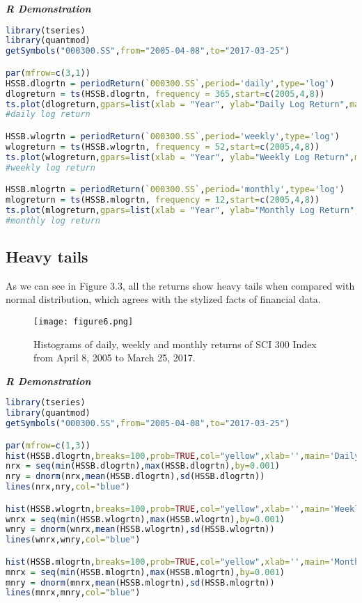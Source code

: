 \documentclass[paper=a4, fontsize=11pt]{scrartcl} %
\numberwithin{equation}{section} %
\numberwithin{figure}{section} %
\numberwithin{table}{section} %
\begin{document}
\bigskip
\textbf{\textit{R Demonstration}}
\begin{lstlisting}[language=R]
library(tseries)
library(quantmod)
getSymbols("000300.SS",from="2005-04-08",to="2017-03-25")

par(mfrow=c(3,1))
HSSB.dlogrtn = periodReturn(`000300.SS`,period='daily',type='log')
dlogreturn = ts(HSSB.dlogrtn, frequency = 365,start=c(2005,4,8))
ts.plot(dlogreturn,gpars=list(xlab = "Year", ylab="Daily Log Return",main="SCI 300 Index [2005/4/8-2017/3/25]",col="blue"))
#daily log return

HSSB.wlogrtn = periodReturn(`000300.SS`,period='weekly',type='log')
wlogreturn = ts(HSSB.wlogrtn, frequency = 52,start=c(2005,4,8))
ts.plot(wlogreturn,gpars=list(xlab = "Year", ylab="Weekly Log Return",main="SCI 300 Index [2005/4/8-2017/3/25]",col="blue"))
#weekly log return

HSSB.mlogrtn = periodReturn(`000300.SS`,period='monthly',type='log')
mlogreturn = ts(HSSB.mlogrtn, frequency = 12,start=c(2005,4,8))
ts.plot(mlogreturn,gpars=list(xlab = "Year", ylab="Monthly Log Return",main="SCI 300 Index [2005/4/8-2017/3/25]",col="blue"))
#monthly log return
\end{lstlisting}

\bigskip
\bigskip
\bigskip
\bigskip
\subsection{Heavy tails}
As we can see in Figure 3.3, all the returns show heavy tails when compared with normal distribution, which agrees with the stylized facts of financial data.\\
\begin{figure}[H]
  \centering
  \texttt{[image: figure6.png]}\\
  \caption{Histograms of daily, weekly and monthly returns of SCI 300 Index from April 8, 2005 to March 25, 2017.}
\end{figure}

\bigskip
\textbf{\textit{R Demonstration}}
\begin{lstlisting}[language=R]
library(tseries)
library(quantmod)
getSymbols("000300.SS",from="2005-04-08",to="2017-03-25")

par(mfrow=c(1,3))
hist(HSSB.dlogrtn,breaks=100,prob=TRUE,col="yellow",xlab='',main='Daily Returns')
nrx = seq(min(HSSB.dlogrtn),max(HSSB.dlogrtn),by=0.001)
nry = dnorm(nrx,mean(HSSB.dlogrtn),sd(HSSB.dlogrtn))
lines(nrx,nry,col="blue")

hist(HSSB.wlogrtn,breaks=100,prob=TRUE,col="yellow",xlab='',main='Weekly Returns')
wnrx = seq(min(HSSB.wlogrtn),max(HSSB.wlogrtn),by=0.001)
wnry = dnorm(wnrx,mean(HSSB.wlogrtn),sd(HSSB.wlogrtn))
lines(wnrx,wnry,col="blue")

hist(HSSB.mlogrtn,breaks=100,prob=TRUE,col="yellow",xlab='',main='Monthly Returns')
mnrx = seq(min(HSSB.mlogrtn),max(HSSB.mlogrtn),by=0.001)
mnry = dnorm(mnrx,mean(HSSB.mlogrtn),sd(HSSB.mlogrtn))
lines(mnrx,mnry,col="blue")
\end{lstlisting}
\end{document}
